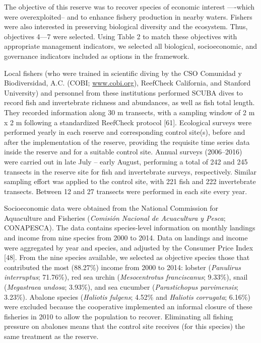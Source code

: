 \documentclass[12pt,]{article}
\begin{document}
The objective of this reserve was to recover species of economic
interest ----which were overexploited-- and to enhance fishery
production in nearby waters. Fishers were also interested in preserving
biological diversity and the ecosystem. Thus, objectives 4---7 were
selected. Using Table 2 to match these objectives with appropriate
management indicators, we selected all biological, socioeconomic, and
governance indicators included as options in the framework.

Local fishers (who were trained in scientific diving by the CSO
Comunidad y Biodiversidad, A.C. (COBI; \url{www.cobi.org}), ReefCheck
California, and Stanford University) and personnel from these
institutions performed SCUBA dives to record fish and invertebrate
richness and abundances, as well as fish total length. They recorded
information along 30 m transects, with a sampling window of 2 m x 2 m
following a standardized ReefCheck protocol {[}61{]}. Ecological surveys
were performed yearly in each reserve and corresponding control site(s),
before and after the implementation of the reserve, providing the
requisite time series data inside the reserve and for a suitable control
site. Annual surveys (2006--2016) were carried out in late July -- early
August, performing a total of 242 and 245 transects in the reserve site
for fish and invertebrate surveys, respectively. Similar sampling effort
was applied to the control site, with 221 fish and 222 invertebrate
transects. Between 12 and 27 transects were performed in each site every
year.

Socioeconomic data were obtained from the National Commission for
Aquaculture and Fisheries (\emph{Comisión Nacional de Acuacultura y
Pesca}; CONAPESCA). The data contains species-level information on
monthly landings and income from nine species from 2000 to 2014. Data on
landings and income were aggregated by year and species, and adjusted by
the Consumer Price Index {[}48{]}. From the nine species available, we
selected as objective species those that contributed the most (88.27\%)
income from 2000 to 2014: lobster (\emph{Panulirus interruptus};
71.76\%), red sea urchin (\emph{Mesocentrotus franciscanus}; 9.33\%),
snail (\emph{Megastraea undosa}; 3.93\%), and sea cucumber
(\emph{Parastichopus parvimensis}; 3.23\%). Abalone species
(\emph{Haliotis fulgens}; 4.52\% and \emph{Haliotis corrugata}; 6.16\%)
were excluded because the cooperative implemented an informal closure of
these fisheries in 2010 to allow the population to recover. Eliminating
all fishing pressure on abalones means that the control site receives
(for this species) the same treatment as the reserve.
\end{document}
